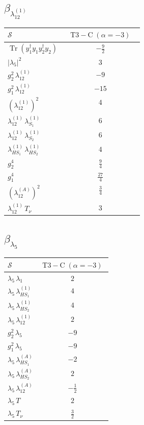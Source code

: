 \documentclass[9pt]{article}
\begin{document}
\subsection*{$ \beta_{\lambda_{12}^{(1)}} $}
\begin{longtable}{@{}p{0.31\linewidth}c@{}}
\toprule
$\mathcal{S}$ & $ \mathrm{T3-C}\;(\alpha=-3) $ \\
\midrule
$ \operatorname{Tr}(y_1^\dagger y_1y_2^\dagger y_2) $ & $ - \frac{9}{2} $ \\
$ |\lambda_5|^2 $ & $ 3 $ \\
$ g_2^2\,\lambda_{12}^{(1)} $ & $ -9 $ \\
$ g_1^2\,\lambda_{12}^{(1)} $ & $ -15 $ \\
$ \left(\lambda_{12}^{(1)}\right)^2 $ & $ 4 $ \\
$ \lambda_{12}^{(1)}\,\lambda_{S_1}^{(1)} $ & $ 6 $ \\
$ \lambda_{12}^{(1)}\,\lambda_{S_2}^{(1)} $ & $ 6 $ \\
$ \lambda_{HS_1}^{(1)}\,\lambda_{HS_2}^{(1)} $ & $ 4 $ \\
$ g_2^4 $ & $ \frac{9}{4} $ \\
$ g_1^4 $ & $ \frac{27}{4} $ \\
$ \left(\lambda_{12}^{(A)}\right)^2 $ & $ \frac{3}{4} $ \\
$ \lambda_{12}^{(1)}\,T_\nu $ & $ 3 $ \\
\bottomrule
\end{longtable}
\subsection*{$ \beta_{\lambda_5} $}
\begin{longtable}{@{}p{0.31\linewidth}c@{}}
\toprule
$\mathcal{S}$ & $ \mathrm{T3-C}\;(\alpha=-3) $ \\
\midrule
$ \lambda_5\,\lambda_1 $ & $ 2 $ \\
$ \lambda_5\,\lambda_{HS_1}^{(1)} $ & $ 4 $ \\
$ \lambda_5\,\lambda_{HS_2}^{(1)} $ & $ 4 $ \\
$ \lambda_5\,\lambda_{12}^{(1)} $ & $ 2 $ \\
$ g_2^2\,\lambda_5 $ & $ -9 $ \\
$ g_1^2\,\lambda_5 $ & $ -9 $ \\
$ \lambda_5\,\lambda_{HS_1}^{(A)} $ & $ -2 $ \\
$ \lambda_5\,\lambda_{HS_2}^{(A)} $ & $ 2 $ \\
$ \lambda_5\,\lambda_{12}^{(A)} $ & $ - \frac{1}{2} $ \\
$ \lambda_5\,T $ & $ 2 $ \\
$ \lambda_5\,T_\nu $ & $ \frac{3}{2} $ \\
\bottomrule
\end{longtable}
\end{document}
